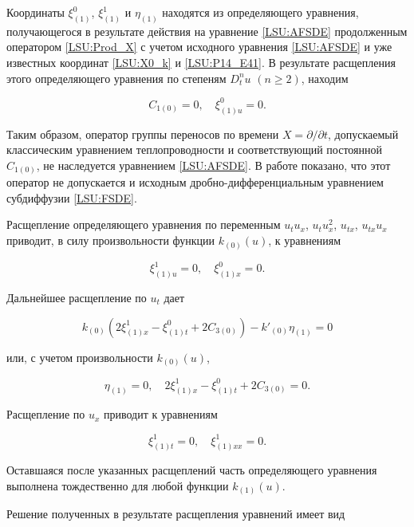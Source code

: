 Координаты $\xi^0_{(1)}$, $\xi^1_{(1)}$ и $\eta_{(1)}$ находятся из определяющего уравнения, получающегося в результате действия на уравнение \eqref{LSU:AFSDE} продолженным оператором \eqref{LSU:Prod_X} с учетом исходного уравнения \eqref{LSU:AFSDE} и уже известных координат \eqref{LSU:X0_k} и \eqref{LSU:P14_E41}. В результате расщепления этого определяющего уравнения по степеням $D^{n}_t u$ $(n \ge 2)$, находим

$$

C_{1(0)}=0, \quad \xi^0_{(1)u}=0. 

$$

Таким образом, оператор группы переносов по времени $X=\partial/{\partial t}$, допускаемый классическим уравнением теплопроводности и соответствующий постоянной $C_{1(0)}$, не наследуется уравнением \eqref{LSU:AFSDE}. В работе \cite{LSU:GKL_PS_09} показано, что этот оператор не допускается и исходным дробно-дифференциальным уравнением субдиффузии \eqref{LSU:FSDE}. 



Расщепление определяющего уравнения по переменным $u_t u_x$, $u_t u_x^2$, $u_{tx}$, $u_{tx} u_x$ приводит, в силу произвольности функции $k_{(0)}(u)$, к уравнениям

$$

\xi^1_{(1)u}=0, \quad \xi^0_{(1)x}=0. 

$$

Дальнейшее расщепление по $u_t$ дает

$$

k_{(0)} (2 \xi^1_{(1)x}-\xi^0_{(1)t}+2C_{3(0)})-k'_{(0)} \eta_{(1)}=0

$$

или, с учетом произвольности $k_{(0)}(u)$, 

$$

\eta_{(1)}=0, \quad 2 \xi^1_{(1)x}-\xi^0_{(1)t}+2C_{3(0)}=0.

$$

Расщепление по $u_{x}$ приводит к уравнениям

$$

\xi^1_{(1)t}=0, \quad \xi^1_{(1)xx}=0. 

$$

Оставшаяся после указанных расщеплений часть определяющего уравнения выполнена тождественно для любой функции $k_{(1)}(u)$. 



Решение полученных в результате расщепления уравнений имеет вид

$$

